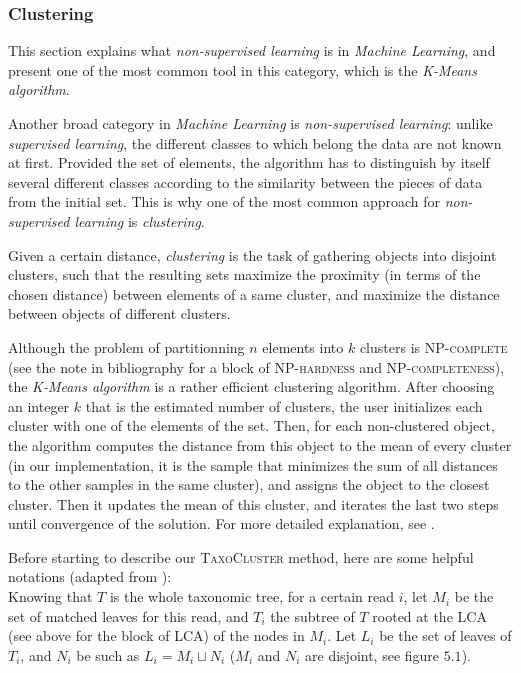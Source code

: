 \documentclass{beamer}
\begin{document}
\begin{frame}
\frametitle{Clustering}

This section explains what \emph{non-supervised learning} is in \emph{Machine Learning}, and present one of the most common tool in this category, which is the \emph{K-Means algorithm}.

Another broad category in \emph{Machine Learning} is \emph{non-supervised learning}: unlike \emph{supervised learning}, the different classes to which belong the data are not known at first. Provided the set of elements, the algorithm has to distinguish by itself several different classes according to the similarity between the pieces of data from the initial set. This is why one of the most common approach for \emph{non-supervised learning} is \emph{clustering}.

Given a certain distance, \emph{clustering} is the task of gathering objects into disjoint clusters, such that the resulting sets maximize the proximity (in terms of the chosen distance) between elements of a same cluster, and maximize the distance between objects of different clusters.

Although the problem of partitionning $n$ elements into $k$ clusters \cite{PartitionIsNPhard} is \textsc{NP-complete}\cite{NPhard} (see the note in bibliography for a block of \textsc{NP-hardness} and \textsc{NP-completeness}), the \emph{K-Means algorithm} \cite{KMeans} is a rather efficient clustering algorithm. After choosing an integer $k$ that is the estimated number of clusters, the user initializes each cluster with one of the elements of the set. Then, for each non-clustered object, the algorithm computes the distance from this object to the mean of every cluster (in our implementation, it is the sample that minimizes the sum of all distances to the other samples in the same cluster), and assigns the object to the closest cluster. Then it updates the mean of this cluster, and iterates the last two steps until convergence of the solution. For more detailed explanation, see \cite{KMeans}.

Before starting to describe our \textsc{TaxoCluster} method, here are some helpful notations (adapted from \cite{Tango1}):\\

Knowing that $T$ is the whole taxonomic tree, for a certain read $i$, let $M_{i}$ be the set of matched leaves for this read, and $T_{i}$ the subtree of $T$ rooted at the LCA (see above for the block of LCA) of the nodes in $M_{i}$. Let $L_{i}$ be the set of leaves of $T_{i}$, and $N_{i}$ be such as $L_{i} = M_{i} \sqcup N_{i}$ ($M_{i}$ and $N_{i}$ are disjoint, see figure $5.1$).


\end{frame}
\end{document}

